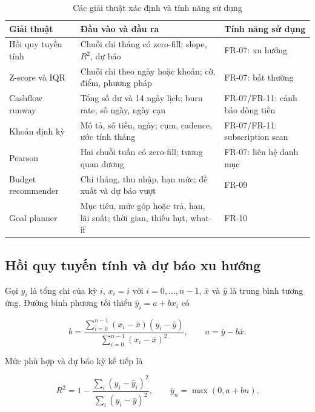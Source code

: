 \begin{table}[htbp]
  \centering
  \caption{Các giải thuật xác định và tính năng sử dụng}
  \label{tab:algorithms}
  \small
  \begin{tabularx}{\textwidth}{|p{3.0cm}|X|X|}
    \hline
    \textbf{Giải thuật} & \textbf{Đầu vào và đầu ra} &
    \textbf{Tính năng sử dụng} \\ \hline
    Hồi quy tuyến tính & Chuỗi chi tháng có zero-fill; slope, $R^2$,
    dự báo & FR-07: xu hướng \\ \hline
    Z-score và IQR & Chuỗi chi theo ngày hoặc khoản; cờ, điểm, phương
    pháp & FR-07: bất thường \\ \hline
    Cashflow runway & Tổng số dư và 14 ngày lịch; burn rate, số ngày,
    ngày cạn & FR-07/FR-11: cảnh báo dòng tiền \\ \hline
    Khoản định kỳ & Mô tả, số tiền, ngày; cụm, cadence, ước tính tháng &
    FR-07/FR-11: subscription scan \\ \hline
    Pearson & Hai chuỗi tuần có zero-fill; tương quan dương & FR-07:
    liên hệ danh mục \\ \hline
    Budget recommender & Chi tháng, thu nhập, hạn mức; đề xuất
    và dự báo vượt & FR-09 \\ \hline
    Goal planner & Mục tiêu, mức góp hoặc trả, hạn, lãi suất; thời gian,
    thiếu hụt, what-if & FR-10 \\ \hline
  \end{tabularx}
\end{table}

\subsection{Hồi quy tuyến tính và dự báo xu hướng}

Gọi $y_i$ là tổng chi của kỳ $i$, $x_i=i$ với
$i=0,\ldots,n-1$, $\bar{x}$ và $\bar{y}$ là trung bình tương ứng.
Đường bình phương tối thiểu $\hat y_i=a+bx_i$ có

\begin{equation}
  b=\frac{\sum_{i=0}^{n-1}(x_i-\bar{x})(y_i-\bar{y})}
          {\sum_{i=0}^{n-1}(x_i-\bar{x})^2},\qquad
  a=\bar{y}-b\bar{x}.
\end{equation}

Mức phù hợp và dự báo kỳ kế tiếp là

\begin{equation}
  R^2=1-\frac{\sum_i(y_i-\hat y_i)^2}
                 {\sum_i(y_i-\bar y)^2},\qquad
  \hat y_n=\max(0,a+bn).
\end{equation}

